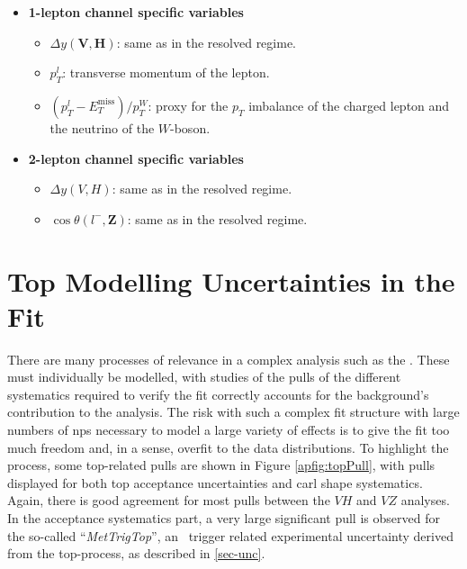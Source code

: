 \begin{itemize}
\begin{itemize}
  \end{itemize}
  \item \textbf{1-lepton channel specific variables}
  \begin{itemize}
      \item $\Delta y(\boldsymbol{V},\boldsymbol{H})$: same as in the resolved regime.
      \item $p_T^l$: transverse momentum of the lepton.
      \item $(p_T^{l} - E_T^{\textrm{miss}})/p_T^W$:  proxy for the $p_T$ imbalance of the charged lepton and the neutrino of the $W$-boson.
  \end{itemize}
  \item \textbf{2-lepton channel specific variables}
  \begin{itemize}
      \item $\Delta y(\textbf{$V$},\textbf{$H$})$: same as in the resolved regime.
      \item $\cos{\theta(\textbf{$l^-$},\textbf{Z})}$: same as in the resolved regime.
  \end{itemize}
\end{itemize}

\clearpage
\section{Top Modelling Uncertainties in the Fit}
There are many processes of relevance in a complex analysis such as the \vhbc. These must individually be modelled, with studies of the pulls of the different systematics required to verify the fit correctly accounts for the background's contribution to the analysis. The risk with such a complex fit structure with large numbers of \glspl{np} necessary to model a large variety of effects is to give the fit too much freedom and, in a sense, overfit to the data distributions. To highlight the process, some top-related pulls are shown in Figure \ref{apfig:topPull}, with pulls displayed for both top acceptance uncertainties and \gls{carl} shape systematics. Again, there is good agreement for most pulls between the $VH$ and $VZ$ analyses. In the acceptance systematics part, a very large significant pull is observed for the so-called ``\textit{MetTrigTop}'', an \etm\ trigger related experimental uncertainty derived from the top-process, as described in \ref{sec-unc}. 


